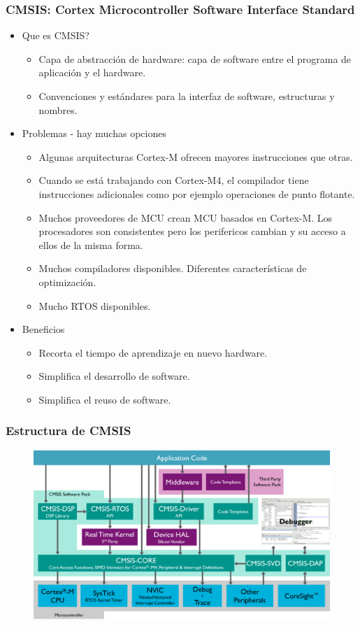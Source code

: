 \documentclass[10.5pt,scale=1.0,t,aspectratio=169,hyperref={pdfpagelabels=false}]{beamer}
\begin{document}
\begin{frame}
	\frametitle{CMSIS: Cortex Microcontroller Software Interface Standard}
	\begin{itemize}
		\item Que es CMSIS?
		\begin{itemize}
			\item Capa de abstracción de hardware: capa de software entre el programa de aplicación y el hardware. 
			\item Convenciones y estándares para la interfaz de software, estructuras y nombres.
		\end{itemize}
		\item Problemas - hay muchas opciones
		\begin{itemize}
			\item Algunas arquitecturas Cortex-M ofrecen mayores instrucciones que otras.
			\item Cuando se está trabajando con Cortex-M4, el compilador tiene instrucciones adicionales como por ejemplo operaciones de punto flotante.
			\item Muchos proveedores de MCU crean MCU basados en Cortex-M. Los procesadores son consistentes pero los perifericos cambian y su acceso a ellos de la misma forma. 
			\item Muchos compiladores disponibles. Diferentes características de optimización.
			\item Mucho RTOS disponibles.
		\end{itemize}
		\item Beneficios
		\begin{itemize}
			\item Recorta el tiempo de aprendizaje en nuevo hardware.
			\item Simplifica el desarrollo de software.
			\item Simplifica el reuso de software.
		\end{itemize}
	\end{itemize}
\end{frame}
\begin{frame}
	\frametitle{Estructura de CMSIS}
	\begin{figure}
		\centering
		\includegraphics[scale=0.5]{CMSISStructure}
	\end{figure}
\end{frame}
\end{document}
